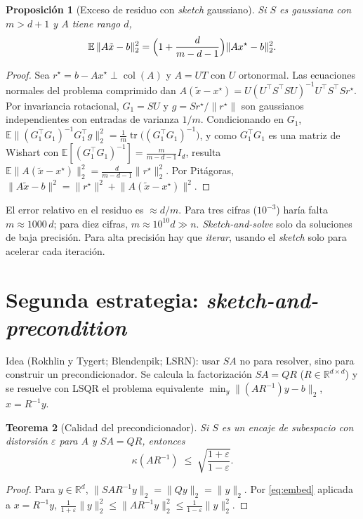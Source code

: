 \documentclass[11pt,a4paper,oneside]{book}
\newtheorem{teorema}{Teorema}[chapter]
\newtheorem{proposicion}[teorema]{Proposición}
\theoremstyle{definition}
\theoremstyle{remark}
\newcommand{\R}{\mathbb{R}}
\newcommand{\E}{\mathbb{E}}
\newcommand{\T}{^{\top}}
\newcommand{\eps}{\varepsilon}
\newcommand{\nrm}[1]{\lVert #1\rVert}
\DeclareMathOperator{\tr}{tr}
\DeclareMathOperator{\col}{col}
\begin{document}
\begin{proposicion}[Exceso de residuo con \emph{sketch} gaussiano]\label{prop:sas-gauss}
Si $S$ es gaussiana con $m>d+1$ y $A$ tiene rango $d$,
\[ \E\,\nrm{A\tilde x-b}_2^2=\Bigl(1+\frac{d}{m-d-1}\Bigr)\nrm{Ax^\star-b}_2^2 . \]
\end{proposicion}

\begin{proof}
Sea $r^\star=b-Ax^\star\perp\col(A)$ y $A=UT$ con $U$ ortonormal. Las ecuaciones normales del problema
comprimido dan $A(\tilde x-x^\star)=U(U\T S\T SU)^{-1}U\T S\T Sr^\star$. Por invariancia rotacional, $G_1=SU$ y
$g=Sr^\star/\nrm{r^\star}$ son gaussianos independientes con entradas de varianza $1/m$. Condicionando en $G_1$,
$\E\nrm{(G_1\T G_1)^{-1}G_1\T g}_2^2=\frac1m\tr\bigl((G_1\T G_1)^{-1}\bigr)$, y como $G_1\T G_1$ es una matriz de Wishart
con $\E[(G_1\T G_1)^{-1}]=\frac{m}{m-d-1}I_d$, resulta $\E\nrm{A(\tilde x-x^\star)}_2^2=\frac{d}{m-d-1}\nrm{r^\star}_2^2$.
Por Pitágoras, $\nrm{A\tilde x-b}^2=\nrm{r^\star}^2+\nrm{A(\tilde x-x^\star)}^2$.
\end{proof}

\begin{cuidado}
El error relativo en el residuo es $\approx d/m$. Para tres cifras ($10^{-3}$) haría falta $m\approx1000\,d$;
para diez cifras, $m\approx10^{10}d\gg n$. \emph{Sketch-and-solve} solo da soluciones de baja precisión. Para alta
precisión hay que \emph{iterar}, usando el \emph{sketch} solo para acelerar cada iteración.
\end{cuidado}

\section{Segunda estrategia: \emph{sketch-and-precondition}}

Idea (Rokhlin y Tygert; Blendenpik; LSRN): usar $SA$ no para resolver, sino para construir un
precondicionador. Se calcula la factorización $SA=QR$ ($R\in\R^{d\times d}$) y se resuelve con LSQR el
problema equivalente $\min_y\nrm{(AR^{-1})y-b}_2$, $x=R^{-1}y$.

\begin{teorema}[Calidad del precondicionador]\label{teo:precond}
Si $S$ es un encaje de subespacio con distorsión $\eps$ para $A$ y $SA=QR$, entonces
\[ \kappa(AR^{-1})\;\le\;\sqrt{\frac{1+\eps}{1-\eps}} . \]
\end{teorema}

\begin{proof}
Para $y\in\R^d$, $\nrm{SAR^{-1}y}_2=\nrm{Qy}_2=\nrm{y}_2$. Por \eqref{eq:embed} aplicada a $x=R^{-1}y$,
$\frac{1}{1+\eps}\nrm{y}_2^2\le\nrm{AR^{-1}y}_2^2\le\frac{1}{1-\eps}\nrm{y}_2^2$.
\end{proof}
\end{document}
